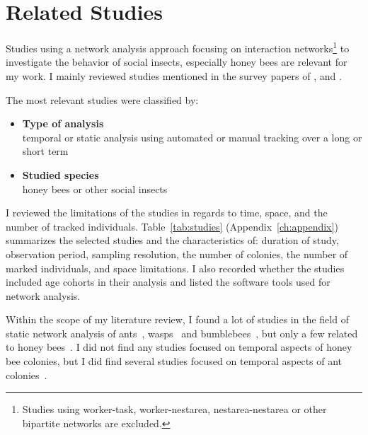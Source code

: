 \section{Related Studies}
\label{ch:relatedwork}

Studies using a network analysis approach focusing on interaction networks\footnote{Studies using worker-task, worker-nestarea, nestarea-nestarea or other bipartite networks are excluded.} to investigate the behavior of social insects, especially honey bees are relevant for my work.
I mainly reviewed studies mentioned in the survey papers of \textcite{Pinter-Wollman2014}, \textcite[chapter~15]{krause2014animal} and \textcite{charbonneau2013social}.

The most relevant studies were classified by:

\begin{itemize}
\item \textbf{Type of analysis}\\
temporal or static analysis using automated or manual tracking over a long or short term
\item \textbf{Studied species}\\
honey bees or other social insects
\end{itemize}

I reviewed the limitations of the studies in regards to time, space, and the number of tracked individuals. Table~\ref{tab:studies} (Appendix~\ref{ch:appendix}) summarizes the selected studies and the characteristics of: duration of study, observation period, sampling resolution, the number of colonies, the number of marked individuals, and space limitations.
I also recorded whether the studies included age cohorts in their analysis and listed the software tools used for network analysis.

Within the scope of my literature review, I found a lot of studies in the field of static network analysis of ants~\cite{greenwald2015ant,pinter2011effect,quevillon2015social,formica2012fitness,waters2012information,sendova2010emergency}, wasps~\cite{naug2009structure} and bumblebees~\cite{otterstatter2007contact}, but only a few related to honey bees~\cite{baracchi2014socio,naug2008structure,scholl2011olfactory,naug2007experimentally}.
I did not find any studies focused on temporal aspects of honey bee colonies, but I did find several studies focused on temporal aspects of ant colonies~\cite{mersch2013tracking,blonder2011time,jeanson2012long}.

